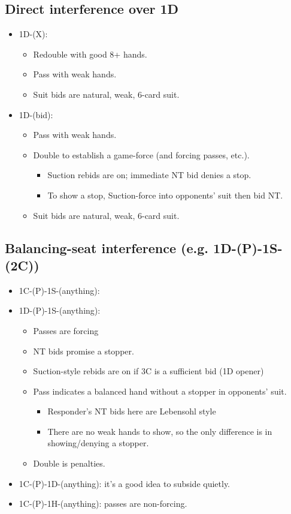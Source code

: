 \documentclass[a4paper,12pt]{article}
\begin{document}
\subsection{Direct interference over 1D}

\begin{itemize}
\item 1D-(X):
	\begin{itemize}
   \item Redouble with good 8+ hands.
   \item Pass with weak hands.
   \item Suit bids are natural, weak, 6-card suit.
	\end{itemize}
\item 1D-(bid):
	\begin{itemize}
   \item Pass with weak hands.
   \item Double to establish a game-force (and forcing passes, etc.).
		\begin{itemize}
      \item Suction rebids are on; immediate NT bid denies a stop.
      \item To show a stop, Suction-force into opponents' suit then bid NT.
		\end{itemize}
   \item Suit bids are natural, weak, 6-card suit.
	\end{itemize}
\end{itemize}

\subsection{Balancing-seat interference (e.g. 1D-(P)-1S-(2C))}

\begin{itemize}
\item 1C-(P)-1S-(anything):
\item 1D-(P)-1S-(anything):
\begin{itemize}
   \item Passes are forcing
   \item NT bids promise a stopper.
   \item Suction-style rebids are on if 3C is a sufficient bid (1D opener)
   \item Pass indicates a balanced hand without a stopper in opponents' suit.
	\begin{itemize}
      \item Responder's NT bids here are Lebensohl style
      \item There are no weak hands to show, so the only difference is in showing/denying a stopper.
		\end{itemize}
   \item Double is penalties.
	\end{itemize}

\item 1C-(P)-1D-(anything): it's a good idea to subside quietly.  

\item 1C-(P)-1H-(anything): passes are non-forcing. 
\end{itemize}
\end{document}
